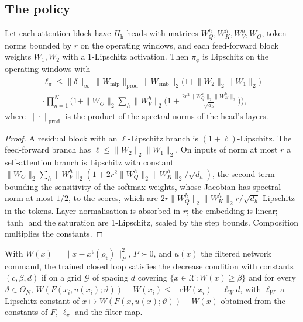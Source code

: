 \documentclass[final,5p,times,twocolumn]{elsarticle}
\begin{document}
\subsection{The policy}
\begin{lemma}\label{lem:lip}
Let each attention block have $H_{\mathrm h}$ heads with matrices $W_Q^h,W_K^h,W_V^h,W_O$, token norms bounded by $r$ on the operating windows, and each feed-forward block weights $W_1,W_2$ with a 1-Lipschitz activation. Then $\pi_\phi$ is Lipschitz on the operating windows with
\begin{equation}\label{eq:lip}
\begin{aligned}\ell_\pi\le\|\bar\delta\|_\infty\,\|W_{\mathrm{mlp}}\|_{\mathrm{prod}}\,\|W_{\mathrm{emb}}\|_2\big(1+\|W_2\|_2\|W_1\|_2\big)\\ \cdot\prod_{n=1}^{N}\Big(1+\|W_O\|_2\sum_h\|W_V^h\|_2\big(1+\tfrac{2r^2\|W_Q^h\|_2\|W_K^h\|_2}{\sqrt{d_h}}\big)\Big),\end{aligned}
\end{equation}
where $\|\cdot\|_{\mathrm{prod}}$ is the product of the spectral norms of the head's layers.
\end{lemma}
\begin{proof}
A residual block with an $\ell$-Lipschitz branch is $(1+\ell)$-Lipschitz. The feed-forward branch has $\ell\le\|W_2\|_2\|W_1\|_2$. On inputs of norm at most $r$ a self-attention branch is Lipschitz with constant $\|W_O\|_2\sum_h\|W_V^h\|_2(1+2r^2\|W_Q^h\|_2\|W_K^h\|_2/\sqrt{d_h})$, the second term bounding the sensitivity of the softmax weights, whose Jacobian has spectral norm at most $1/2$, to the scores, which are $2r\|W_Q^h\|_2\|W_K^h\|_2r/\sqrt{d_h}$-Lipschitz in the tokens. Layer normalisation is absorbed in $r$; the embedding is linear; $\tanh$ and the saturation are 1-Lipschitz, scaled by the step bounds. Composition multiplies the constants.
\end{proof}

\begin{definition}\label{def:dec}
With $W(x)=\|x-x^{\mathrm t}(\rho_{\mathrm t})\|_P^2$, $P\succ0$, and $u(x)$ the filtered network command, the trained closed loop satisfies the decrease condition with constants $(c,\beta,d)$ if on a grid $\mathcal G$ of spacing $d$ covering $\{x\in\mathcal X:W(x)\ge\beta\}$ and for every $\vartheta\in\Theta_N$, $W(F(x_i,u(x_i);\vartheta))-W(x_i)\le-cW(x_i)-\ell_Wd$, with $\ell_W$ a Lipschitz constant of $x\mapsto W(F(x,u(x);\vartheta))-W(x)$ obtained from the constants of $F$, $\ell_\pi$ and the filter map.
\end{definition}
\end{document}
